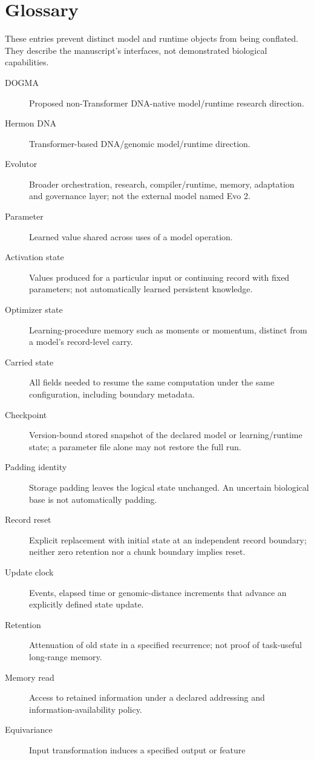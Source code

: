 \chapter*{Glossary}
These entries prevent distinct model and runtime objects from being conflated.
They describe the manuscript's interfaces, not demonstrated biological capabilities.
\begin{description}
\item[DOGMA] Proposed non-Transformer DNA-native model/runtime research direction.
\item[Hermon DNA] Transformer-based DNA/genomic model/runtime direction.
\item[Evolutor] Broader orchestration, research, compiler/runtime, memory,
adaptation and governance layer; not the external model named Evo 2.
\item[Parameter] Learned value shared across uses of a model operation.
\item[Activation state] Values produced for a particular input or continuing
record with fixed parameters; not automatically learned persistent knowledge.
\item[Optimizer state] Learning-procedure memory such as moments or momentum,
distinct from a model's record-level carry.
\item[Carried state] All fields needed to resume the same computation under
the same configuration, including boundary metadata.
\item[Checkpoint] Version-bound stored snapshot of the declared model or
learning/runtime state; a parameter file alone may not restore the full run.
\item[Padding identity] Storage padding leaves the logical state unchanged.
An uncertain biological base is not automatically padding.
\item[Record reset] Explicit replacement with initial state at an independent
record boundary; neither zero retention nor a chunk boundary implies reset.
\item[Update clock] Events, elapsed time or genomic-distance increments that
advance an explicitly defined state update.
\item[Retention] Attenuation of old state in a specified recurrence; not proof
of task-useful long-range memory.
\item[Memory read] Access to retained information under a declared addressing
and information-availability policy.
\item[Equivariance] Input transformation induces a specified output or feature

\end{description}
